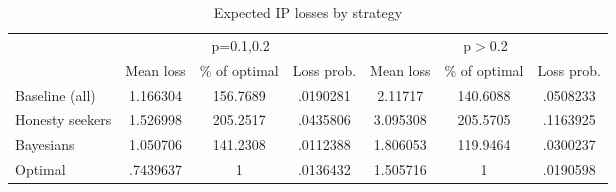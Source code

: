 \begin{table}[htbp]\centering
\caption{Expected IP losses by strategy}
\begin{tabular}{l c c c|c c c}
\hline\hline
            & \multicolumn{3}{c}{p=0.1,0.2}            &     \multicolumn{3}{c}{p$>$0.2}             \\
            &   Mean loss&\% of optimal&  Loss prob.&   Mean loss&\% of optimal&  Loss prob.\\
\hline
Baseline (all)&    1.166304&    156.7689&    .0190281&     2.11717&    140.6088&    .0508233\\
Honesty seekers&    1.526998&    205.2517&    .0435806&    3.095308&    205.5705&    .1163925\\
Bayesians   &    1.050706&    141.2308&    .0112388&    1.806053&    119.9464&    .0300237\\
Optimal     &    .7439637&           1&    .0136432&    1.505716&           1&    .0190598\\
\hline\hline
\end{tabular}
\end{table}
